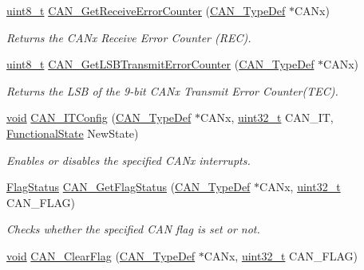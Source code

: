 \begin{DoxyCompactItemize}
\hyperlink{_p_e___types_8h_aba7bc1797add20fe3efdf37ced1182c5}{uint8\+\_\+t} \hyperlink{group___c_a_n___private___functions_ga6903eecbec40eb1361d915ddde9a3274}{C\+A\+N\+\_\+\+Get\+Receive\+Error\+Counter} (\hyperlink{struct_c_a_n___type_def}{C\+A\+N\+\_\+\+Type\+Def} $\ast$C\+A\+Nx)
\begin{DoxyCompactList}\small\item\em Returns the C\+A\+Nx Receive Error Counter (R\+EC). \end{DoxyCompactList}\item 
\hyperlink{_p_e___types_8h_aba7bc1797add20fe3efdf37ced1182c5}{uint8\+\_\+t} \hyperlink{group___c_a_n___private___functions_ga85ee0c35bf7ca15d4e4c862eef534843}{C\+A\+N\+\_\+\+Get\+L\+S\+B\+Transmit\+Error\+Counter} (\hyperlink{struct_c_a_n___type_def}{C\+A\+N\+\_\+\+Type\+Def} $\ast$C\+A\+Nx)
\begin{DoxyCompactList}\small\item\em Returns the L\+SB of the 9-\/bit C\+A\+Nx Transmit Error Counter(\+T\+E\+C). \end{DoxyCompactList}\item 
\hyperlink{usb__devapi_8h_afabf60e7f57651d6d595a02c75f07cd0}{void} \hyperlink{group___c_a_n___private___functions_gad1a8b2499a780b5bfa4accb3597b02f4}{C\+A\+N\+\_\+\+I\+T\+Config} (\hyperlink{struct_c_a_n___type_def}{C\+A\+N\+\_\+\+Type\+Def} $\ast$C\+A\+Nx, \hyperlink{_p_e___types_8h_a33594304e786b158f3fb30289278f5af}{uint32\+\_\+t} C\+A\+N\+\_\+\+IT, \hyperlink{agilefox_2library_2inc_2stm32f10x__type_8h_ac9a7e9a35d2513ec15c3b537aaa4fba1}{Functional\+State} New\+State)
\begin{DoxyCompactList}\small\item\em Enables or disables the specified C\+A\+Nx interrupts. \end{DoxyCompactList}\item 
\hyperlink{agilefox_2library_2inc_2stm32f10x__type_8h_a89136caac2e14c55151f527ac02daaff}{Flag\+Status} \hyperlink{group___c_a_n___private___functions_ga2faad96caf823ef463cc5b5b25c480bb}{C\+A\+N\+\_\+\+Get\+Flag\+Status} (\hyperlink{struct_c_a_n___type_def}{C\+A\+N\+\_\+\+Type\+Def} $\ast$C\+A\+Nx, \hyperlink{_p_e___types_8h_a33594304e786b158f3fb30289278f5af}{uint32\+\_\+t} C\+A\+N\+\_\+\+F\+L\+AG)
\begin{DoxyCompactList}\small\item\em Checks whether the specified C\+AN flag is set or not. \end{DoxyCompactList}\item 
\hyperlink{usb__devapi_8h_afabf60e7f57651d6d595a02c75f07cd0}{void} \hyperlink{group___c_a_n___private___functions_ga2c01646d5d3a2d7045e8dd71f58f8742}{C\+A\+N\+\_\+\+Clear\+Flag} (\hyperlink{struct_c_a_n___type_def}{C\+A\+N\+\_\+\+Type\+Def} $\ast$C\+A\+Nx, \hyperlink{_p_e___types_8h_a33594304e786b158f3fb30289278f5af}{uint32\+\_\+t} C\+A\+N\+\_\+\+F\+L\+AG)

\end{DoxyCompactItemize}
